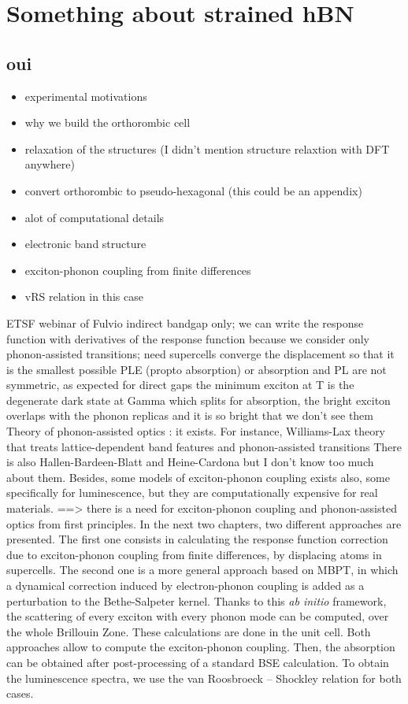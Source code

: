 \chapter{Something about strained hBN}
\chaptertoc{}

\section{oui}

\begin{itemize}
	\item experimental motivations
	\item why we build the orthorombic cell 
	\item relaxation of the structures (I didn't mention structure relaxtion with DFT anywhere)
	\item convert orthorombic to pseudo-hexagonal (this could be an appendix)
	\item alot of computational details
	\item electronic band structure 
	\item exciton-phonon coupling from finite differences
	\item vRS relation in this case 
\end{itemize}
%
%
ETSF webinar of Fulvio
indirect bandgap only; we can write the response function with derivatives of the response function because we consider only phonon-assisted transitions; need supercells
converge the displacement so that it is the smallest possible
PLE (propto absorption) or absorption and PL are not symmetric, as expected for direct gaps
the minimum exciton at T is the degenerate dark state at Gamma which splits
for absorption, the bright exciton overlaps with the phonon replicas and it is so bright that we don't see them 
%
%
Theory of phonon-assisted optics : it exists. For instance, Williams-Lax theory that treats lattice-dependent band features and phonon-assisted transitions 
There is also Hallen-Bardeen-Blatt and Heine-Cardona but I don't know too much about them.
Besides, some models of exciton-phonon coupling exists also, some specifically for luminescence, but they are computationally expensive for real materials.
==> there is a need for exciton-phonon coupling and phonon-assisted optics from first principles. In the next two chapters, two different approaches are presented. The first one consists in calculating the response function correction due to exciton-phonon coupling from finite differences, by displacing atoms in supercells. The second one is a more general approach based on \acrshort{MBPT}, in which a dynamical correction induced by electron-phonon coupling is added as a perturbation to the Bethe-Salpeter kernel. Thanks to this \textit{ab initio} framework, the scattering of every exciton with every phonon mode can be computed, over the whole Brillouin Zone. These calculations are done in the unit cell.
Both approaches allow to compute the exciton-phonon coupling. Then, the absorption can be obtained after post-processing of a standard \acrshort{BSE} calculation. To obtain the luminescence spectra, we use the van Roosbroeck -- Shockley relation for both cases.

